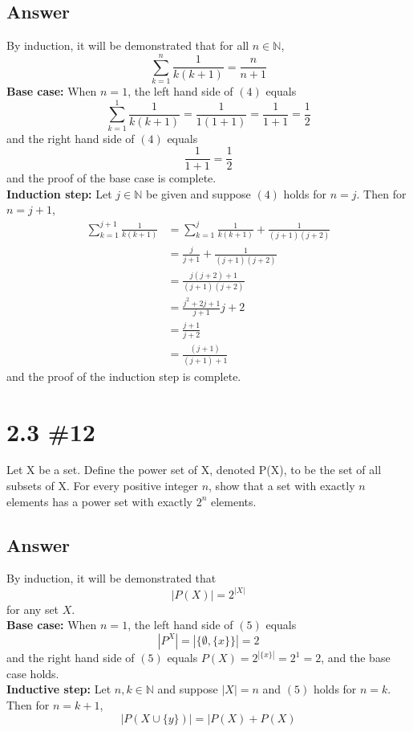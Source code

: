 \documentclass[
	12pt, %
]{fphw}
\newcommand\set[1]{\{#1\}}
\newcommand\qed{\text{$\blacksquare$}}
\newcommand\N{\mathbb{N}}
\begin{document}
\subsection*{Answer} By induction, it will be demonstrated that for all $n \in \N{}$,
\begin{equation}
\sum^n_{k = 1} \frac{1}{k(k+1)} = \frac{n}{n+1}
\end{equation}
\textbf{Base case:} When $n = 1$, the left hand side of $(4)$ equals
$$
\sum^1_{k = 1} \frac{1}{k(k+1)} =  \frac{1}{1(1+1)} = \frac{1}{1+1} = \frac{1}{2}
$$
and the right hand side of $(4)$ equals
$$
\frac{1}{1+1} = \frac{1}{2}
$$
and the proof of the base case is complete.\\
\textbf{Induction step:} Let $j \in \N{}$ be given and suppose $(4)$ holds for $n = j$. Then for $n = j+1$,
\begin{align*}
\sum^{j+1}_{k = 1} \frac{1}{k(k+1)} &= \sum^{j}_{k = 1} \frac{1}{k(k+1)} + \frac{1}{(j+1)(j+2)}\\
&=  \frac{j}{j+1} +  \frac{1}{(j+1)(j+2)}\\
&= \frac{j(j+2) + 1}{(j+1)(j+2)}\\
&= \frac{j^2 + 2j + 1}{j+1}{j+2}\\
&= \frac{j+1}{j+2}\\
&= \frac{(j+1)}{(j+1)+1}
\end{align*}
and the proof of the induction step is complete. \qed

\newpage
\section*{2.3 \#12}

\begin{problem}
Let X be a set. Define the power set of X, denoted P(X), to be the set of all subsets of X. For every positive integer $n$, show that a set with exactly $n$ elements has a power set with exactly $2^n$ elements.

\end{problem}


\subsection*{Answer} By induction, it will be demonstrated that
\begin{equation}
|P(X)| = 2^{|X|}
\end{equation}
for any set $X$.\\
\textbf{Base case:} When $n = 1$, the left hand side of $(5)$ equals
$$
| P^X | = |\set{\emptyset, \set{x}}| = 2
$$
and the right hand side of $(5)$ equals $P(X)=2^{|\set{x}|} = 2^1 = 2$, and the base case holds.\\
\textbf{Inductive step:}
Let $n, k \in \N{}$ and suppose $|X| = n$ and $(5)$ holds for $n = k$. Then for $n = k+1$,
$$
|P(X \cup \set{y})| = |P(X) + P(X)
$$
\end{document}
